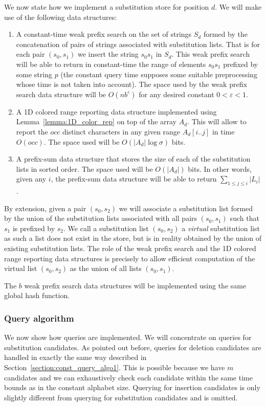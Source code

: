 \documentclass{article}
\newcommand{\?}{\mskip1.5mu}
\renewcommand{\epsilon}{\varepsilon}
\begin{document}
We now state how we implement a substitution store for position $d$. We will make use of the following data structures:
\begin{enumerate}
\item A constant-time weak prefix search on the set of strings $S_d$ formed by the concatenation of pairs of strings associated with substitution lists. That is for each pair $(s_0,s_1)$ we insert the string $s_0s_1$ in $S_d$. This weak prefix search will be able to return in constant-time the range of elements $s_0s_1$ prefixed by some string $p$ (the constant query time supposes some suitable preprocessing whose time is not taken into account). The space used by the weak prefix search data structure will be $O(nb^\epsilon)$ for any desired constant $0<\epsilon<1$. 
\item A 1D colored range reporting data structure implemented using Lemma~\ref{lemma:1D_color_rep} on top of the array $A_d$. This will allow to report the $occ$ distinct characters in any given range $A_d[i..j]$ in time $O(occ)$. The space used will be $O(|A_d|\log\sigma)$ bits. 
\item A prefix-sum data structure that stores the size of each of the substitution lists in sorted order. The space used will be $O(|A_d|)$ bits. In other words, given any $i$, the prefix-sum data structure will be able to return $\sum_{1\leq j\leq i}|L_i|$. 
\end{enumerate}

By extension, given a pair $(s_0,s_2)$ we will associate a substitution list formed by the union of the substitution lists associated with all pairs $(s_0,s_1)$ such that $s_1$ is prefixed by $s_2$. We call a substitution list $(s_0,s_2)$ a \emph{virtual} substitution list as such a list does not exist in the store, but is in reality obtained by the union of existing  substitution lists. The role of the weak prefix search and the 1D colored range reporting data structures is precisely to allow efficient computation of the virtual list $(s_0,s_2)$ as the union of all lists $(s_0,s_1)$. 

The $b$ weak prefix search data structures will be implemented using the same global hash function. 
\subsubsection{Query algorithm}

We now show how queries are implemented. We will concentrate on queries for substitution candidates. As pointed out before, queries for deletion candidates are handled in exactly the same way described in Section~\ref{section:const_query_algo1}. This is possible because we have $m$ candidates and we can exhaustively check each candidate within the same time bounds as in the constant alphabet size. Querying for insertion candidates is only slightly different from querying for substitution candidates and is omitted. 
\end{document}
